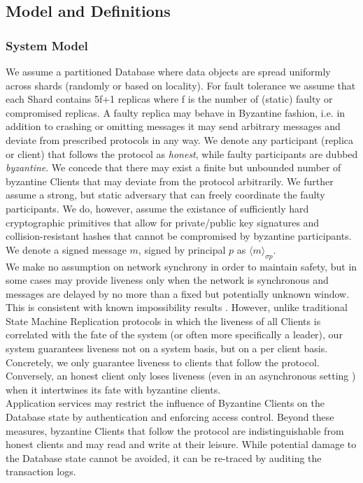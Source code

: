 \subsection{Model and Definitions}

\subsubsection{System Model}
We assume a partitioned Database where data objects are spread uniformly across shards (randomly or based on locality). For fault tolerance we assume that each Shard contains 5f+1 replicas where f is the number of (static) faulty or compromised replicas. A faulty replica may behave in Byzantine fashion, i.e. in addition to crashing or omitting messages it may send arbitrary messages and deviate from prescribed protocols in any way.
We denote any participant (replica or client) that follows the protocol as \textit{honest}, while faulty participants are dubbed \textit{byzantine}. We concede that there may exist a finite but unbounded number of byzantine Clients that may deviate from the protocol arbitrarily. 
 We further assume a strong, but static adversary that can freely coordinate the faulty participants.
 We do, however, assume the existance of sufficiently hard cryptographic primitives that allow for private/public key signatures and collision-resistant hashes that cannot be compromised by byzantine participants. We denote a signed message $m$, signed by principal $p$ as $\langle m \rangle_{\sigma p}$. \\
 
We make no assumption on network synchrony in order to maintain safety, but in some cases may provide liveness  only when the network is synchronous and messages are delayed by no more than a fixed but potentially unknown window. This is consistent with known impossibility results \cite{fischer1985impossibility}.
However, unlike traditional State Machine Replication protocols in which the liveness of all Clients is correlated with the fate of the system (or often more specifically a leader), our system guarantees liveness not on a system basis, but on a per client basis. Concretely, we only guarantee liveness to clients that follow the protocol. Conversely, an honest client only loses liveness (even in an asynchronous setting ) when it intertwines its fate with byzantine clients.\\

Application services may restrict the influence of Byzantine Clients on the Database state by authentication and enforcing access control. Beyond these measures, byzantine Clients that follow the protocol are indistinguishable from honest clients and may read and write at their leisure. While potential damage to the Database state cannot be avoided, it can be re-traced by auditing the transaction logs.\\


